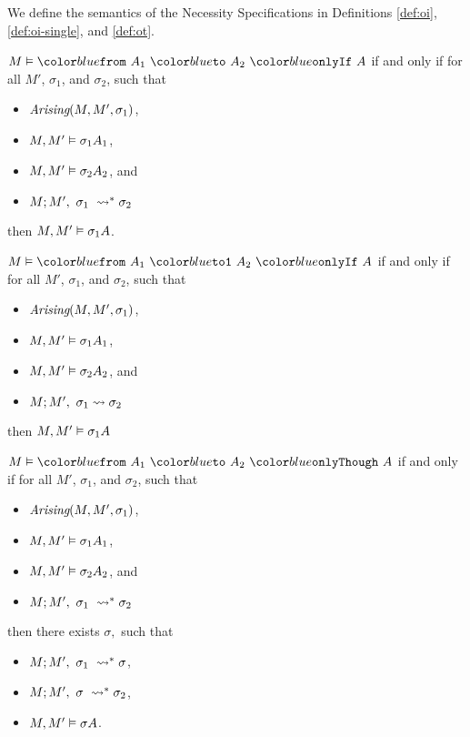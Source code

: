 We define the semantics of the Necessity Specifications in Definitions \ref{def:oi}, \ref{def:oi-single}, and \ref{def:ot}.
\begin{definition}[Only If]
\label{def:oi}
$\satisfies{M}{\onlyIf {A_1}{A_2}{A}}$ if and only if for all
$M'$, $\sigma_1$, and $\sigma_2$, such that 
\begin{itemize}
\item
$\textit{Arising}(M, M', \sigma_1)$,
\item
$M , M' \vDash \sigma_1{A_1}$,
\item
$M , M' \vDash \sigma_2{A_2}$, and
\item
$M ; M',\ \sigma_1\ \leadsto^* \sigma_2$
\end{itemize}
then $M , M' \vDash \sigma_1{A}$.
\end{definition} 

\begin{definition}
\label{def:oi-single}
$\satisfies{M}{\onlyIfSingle {A_1}{A_2}{A}}$ if and only if for all
$M'$, $\sigma_1$, and $\sigma_2$, such that 
\begin{itemize}
\item
$\textit{Arising}(M, M', \sigma_1)$,
\item
$M , M' \vDash \sigma_1{A_1}$,
\item
$M , M' \vDash \sigma_2{A_2}$, and
\item
$M ; M',\ \sigma_1 \leadsto \sigma_2$
\end{itemize}
then $M , M' \vDash \sigma_1{A}$
\end{definition}

\begin{definition}
\label{def:ot}
$\satisfies{M}{\onlyThrough {A_1}{A_2}{A}}$ if and only if for all
$M'$, $\sigma_1$, and $\sigma_2$, such that 
\begin{itemize}
\item
$\textit{Arising}(M, M', \sigma_1)$,
\item
$M , M' \vDash \sigma_1{A_1}$,
\item
$M , M' \vDash \sigma_2{A_2}$, and
\item
$M ; M',\ \sigma_1\ \leadsto^* \sigma_2$
\end{itemize}
then there exists $\sigma,$ such that
\begin{itemize}
\item
$M ; M',\ \sigma_1\ \leadsto^* \sigma$,
\item
$M ; M',\ \sigma\ \leadsto^* \sigma_2$,
\item
$M , M' \vDash \sigma{A}$.
\end{itemize}
\end{definition}

